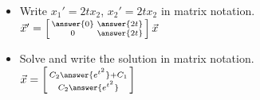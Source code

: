 \documentclass{ximera}
\begin{document}
\begin{exercise}%
    \begin{itemize}
        \item Write $x_1'=2tx_2$, $x_2'=2tx_2$ in matrix notation.\\
            $\vec{x}' = \left[ \begin{smallmatrix}
                \answer{0} & \answer{2t} \\
                0 & \answer{2t}
            \end{smallmatrix}\right] \vec{x}$
        \item Solve and write the solution in matrix notation.\\
            $\vec{x} = \left[ \begin{smallmatrix}
                C_2 \answer{e^{t^2}} + C_1 \\
                C_2 \answer{e^{t^2}}
            \end{smallmatrix}\right]$
    \end{itemize}
\end{exercise}
\end{document}
